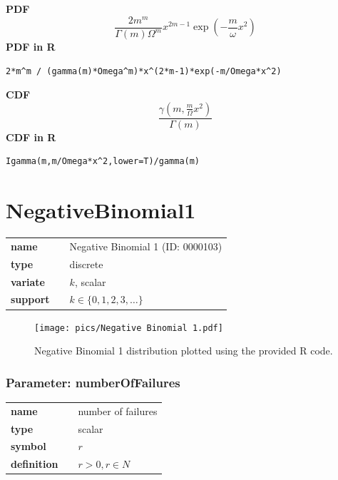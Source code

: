 \documentclass{article}
\begin{document}
\smallskip \noindent \hspace{.2cm} \textbf{PDF} 
\begin{equation*}\frac{2m^m}{\Gamma(m)\Omega^m}x^{2m-1} \exp(-\frac{m}{\omega}x^2)\end{equation*}
\smallskip \noindent \hspace{.2cm} \textbf{PDF in R}  
\begin{verbatim}2*m^m / (gamma(m)*Omega^m)*x^(2*m-1)*exp(-m/Omega*x^2)\end{verbatim}
\smallskip \noindent \hspace{.2cm} \textbf{CDF} 
\begin{equation*}\frac{\gamma(m,\frac{m}{\Omega}x^2)}{\Gamma(m)}\end{equation*}
\smallskip \noindent \hspace{.2cm} \textbf{CDF in R} 
\begin{verbatim}Igamma(m,m/Omega*x^2,lower=T)/gamma(m)\end{verbatim}
\smallskip\section*{NegativeBinomial1} 

  \bigskip 

\begin{tabular}{p{2cm}cl}
\textbf{name} & & Negative Binomial 1 (ID: 0000103)\\ 
 
\textbf{type} & & discrete \\ 

\textbf{variate} & & $k$, scalar \\ 

\textbf{support} & & $k \in \{0,1,2,3,\dots\}$
\end{tabular}

\begin{figure}[ht!]
\centering
  \texttt{[image: pics/Negative Binomial 1.pdf]}
 \caption{Negative Binomial 1 distribution plotted using the provided R code.}
 \label{fig:Negative Binomial 1}
\end{figure}

\subsubsection*{Parameter: numberOfFailures}

\noindent\begin{tabular}{p{2cm}cl}
\textbf{name} & & number of failures \\
\textbf{type} & & scalar \\
\textbf{symbol} & & $r$  \\
\textbf{definition} & & $r > 0, r \in N$
\end{tabular}
\end{document}
